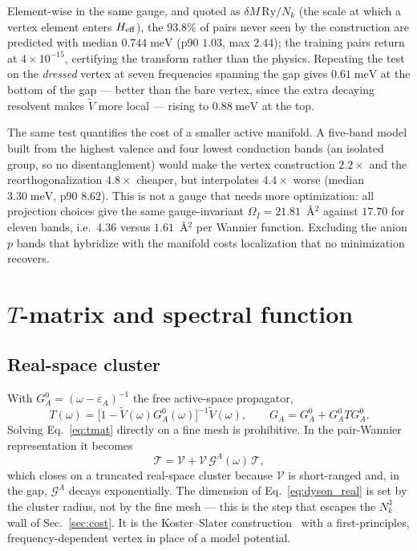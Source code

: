 \documentclass[aps,prx,reprint,superscriptaddress,nofootinbib,longbibliography]{revtex4-2}
\newcommand{\Vt}{\widetilde{V}}
\newcommand{\meV}{\;\mathrm{meV}}
\begin{document}
Element-wise in the same gauge, and quoted as
$\delta M\,\mathrm{Ry}/N_k$ (the scale at which a vertex element enters
$H_{\rm eff}$), the $93.8\%$ of pairs never seen by the construction are
predicted with median $0.744\meV$ (p90 $1.03$, max $2.44$); the training pairs
return at $4\times10^{-15}$, certifying the transform rather than the physics.
Repeating the test on the \emph{dressed} vertex at seven frequencies spanning
the gap gives $0.61\meV$ at the bottom of the gap --- better than the bare
vertex, since the extra decaying resolvent makes $\Vt$ more local --- rising to
$0.88\meV$ at the top.

The same test quantifies the cost of a smaller active manifold. A five-band
model built from the highest valence and four lowest conduction bands (an
isolated group, so no disentanglement) would make the vertex construction
$2.2\times$ and the reorthogonalization $4.8\times$ cheaper, but interpolates
$4.4\times$ worse (median $3.30\meV$, p90 $8.62$). This is not a gauge that
needs more optimization: all projection choices give the same gauge-invariant
$\Omega_I = 21.81$~\AA$^2$ against $17.70$ for eleven bands, i.e.\ $4.36$ versus
$1.61$~\AA$^2$ per Wannier function. Excluding the anion $p$ bands that
hybridize with the manifold costs localization that no minimization recovers.


\section{$T$-matrix and spectral function}
\label{sec:tmatrix}

\subsection{Real-space cluster}

With $G^0_A = (\omega - \varepsilon_A)^{-1}$ the free active-space propagator,
\begin{equation}
  T(\omega) = \big[1 - \Vt(\omega) G^0_A(\omega)\big]^{-1} \Vt(\omega),
  \qquad
  G_A = G^0_A + G^0_A T G^0_A .
  \label{eq:tmat}
\end{equation}
Solving Eq.~\eqref{eq:tmat} directly on a fine mesh is prohibitive. In the
pair-Wannier representation it becomes
\begin{equation}
  \mathcal{T} = \mathcal{V} + \mathcal{V}\, \mathcal{G}^A(\omega)\, \mathcal{T},
  \label{eq:dyson_real}
\end{equation}
which closes on a truncated real-space cluster because $\mathcal{V}$ is
short-ranged and, in the gap, $\mathcal{G}^A$ decays exponentially. The
dimension of Eq.~\eqref{eq:dyson_real} is set by the cluster radius, not by the
fine mesh --- this is the step that escapes the $N_k^3$ wall of
Sec.~\ref{sec:cost}. It is the Koster--Slater
construction~\cite{KosterSlater1954} with a first-principles, frequency-dependent
vertex in place of a model potential.
\end{document}
